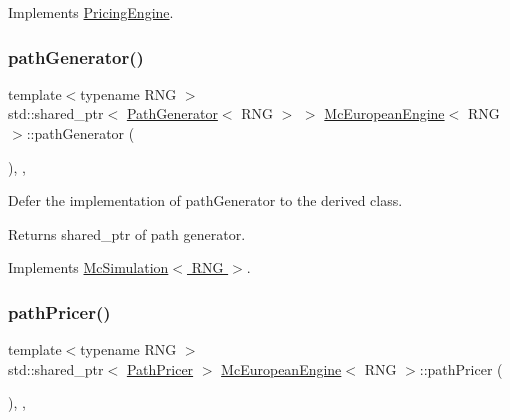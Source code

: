 Implements \hyperlink{class_pricing_engine_a733511ffc3cf5e4dc1fbc2a39208d8bd}{Pricing\+Engine}.

\hypertarget{class_mc_european_engine_af3bd77fe30b60833448ee44efe6280d9}{}\label{class_mc_european_engine_af3bd77fe30b60833448ee44efe6280d9} 
\subsubsection{\texorpdfstring{path\+Generator()}{pathGenerator()}}
{\footnotesize\ttfamily template$<$typename R\+NG $>$ \\
std\+::shared\+\_\+ptr$<$ \hyperlink{class_path_generator}{Path\+Generator}$<$ R\+NG $>$ $>$ \hyperlink{class_mc_european_engine}{Mc\+European\+Engine}$<$ R\+NG $>$\+::path\+Generator (\begin{DoxyParamCaption}{ }\end{DoxyParamCaption})\hspace{0.3cm}{\ttfamily [override]}, {\ttfamily [private]}, {\ttfamily [virtual]}}



Defer the implementation of path\+Generator to the derived class. 

\begin{DoxyReturn}{Returns}
shared\+\_\+ptr of path generator. 
\end{DoxyReturn}


Implements \hyperlink{class_mc_simulation_a44086a1efd452d8644c9f2e52417038f}{Mc\+Simulation$<$ R\+N\+G $>$}.

\hypertarget{class_mc_european_engine_aa504b56142c757d49cc4c9e079682f6d}{}\label{class_mc_european_engine_aa504b56142c757d49cc4c9e079682f6d} 
\subsubsection{\texorpdfstring{path\+Pricer()}{pathPricer()}}
{\footnotesize\ttfamily template$<$typename R\+NG $>$ \\
std\+::shared\+\_\+ptr$<$ \hyperlink{class_path_pricer}{Path\+Pricer} $>$ \hyperlink{class_mc_european_engine}{Mc\+European\+Engine}$<$ R\+NG $>$\+::path\+Pricer (\begin{DoxyParamCaption}{ }\end{DoxyParamCaption})\hspace{0.3cm}{\ttfamily [override]}, {\ttfamily [private]}, {\ttfamily [virtual]}}



